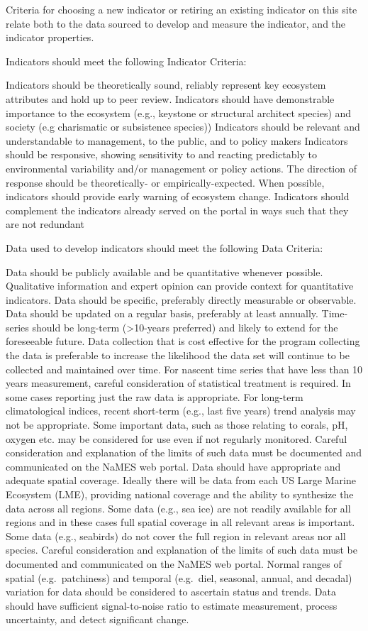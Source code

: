 \documentclass[
]{book}
\begin{document}
Criteria for choosing a new indicator or retiring an existing indicator on this site relate both to the data sourced to develop and measure the indicator, and the indicator properties.

Indicators should meet the following Indicator Criteria:

Indicators should be theoretically sound, reliably represent key ecosystem attributes and hold up to peer review.
Indicators should have demonstrable importance to the ecosystem (e.g., keystone or structural architect species) and society (e.g charismatic or subsistence species))
Indicators should be relevant and understandable to management, to the public, and to policy makers
Indicators should be responsive, showing sensitivity to and reacting predictably to environmental variability and/or management or policy actions.
The direction of response should be theoretically- or empirically-expected.
When possible, indicators should provide early warning of ecosystem change.
Indicators should complement the indicators already served on the portal in ways such that they are not redundant

Data used to develop indicators should meet the following Data Criteria:

Data should be publicly available and be quantitative whenever possible. Qualitative information and expert opinion can provide context for quantitative indicators.
Data should be specific, preferably directly measurable or observable.
Data should be updated on a regular basis, preferably at least annually.
Time-series should be long-term (\textgreater10-years preferred) and likely to extend for the foreseeable future.
Data collection that is cost effective for the program collecting the data is preferable to increase the likelihood the data set will continue to be collected and maintained over time.
For nascent time series that have less than 10 years measurement, careful consideration of statistical treatment is required. In some cases reporting just the raw data is appropriate.
For long-term climatological indices, recent short-term (e.g., last five years) trend analysis may not be appropriate.
Some important data, such as those relating to corals, pH, oxygen etc. may be considered for use even if not regularly monitored.
Careful consideration and explanation of the limits of such data must be documented and communicated on the NaMES web portal.
Data should have appropriate and adequate spatial coverage.
Ideally there will be data from each US Large Marine Ecosystem (LME), providing national coverage and the ability to synthesize the data across all regions.
Some data (e.g., sea ice) are not readily available for all regions and in these cases full spatial coverage in all relevant areas is important.
Some data (e.g., seabirds) do not cover the full region in relevant areas nor all species.
Careful consideration and explanation of the limits of such data must be documented and communicated on the NaMES web portal.
Normal ranges of spatial (e.g.~patchiness) and temporal (e.g.~diel, seasonal, annual, and decadal) variation for data should be considered to ascertain status and trends.
Data should have sufficient signal-to-noise ratio to estimate measurement, process uncertainty, and detect significant change.
\end{document}

